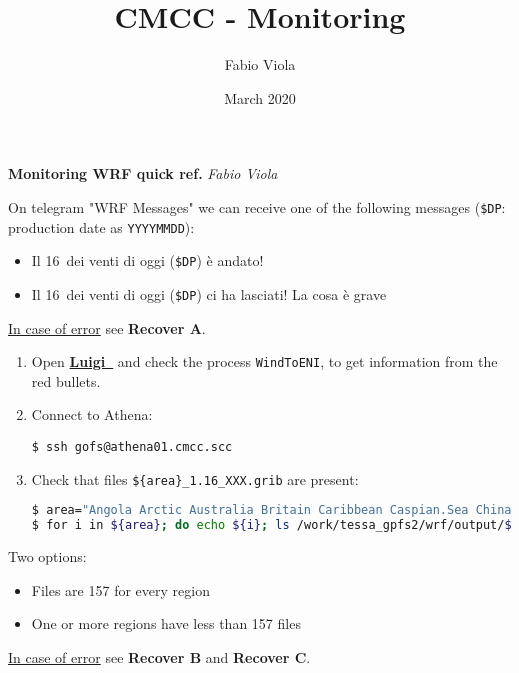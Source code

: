 \documentclass[twocolumn,8pt]{article}
\title{CMCC - Monitoring}
\author{Fabio Viola}
\date{March 2020}
\begin{document}

\LARGE \textbf{Monitoring WRF quick ref.}  \hfill \textit{\small Fabio Viola}\normalsize

\begin{mdframed}[frametitle=(A)\ -- Before 8.45 am]

On telegram "WRF Messages" we can receive one of the following messages (\texttt{\$DP}: production date as \texttt{YYYYMMDD}):
\begin{itemize}\itemsep0pt
\item[{\textcolor{ForestGreen}{\faCheckCircle}}] Il 16\textdegree\, dei venti di oggi (\texttt{\$DP}) è andato!
\item[{\textcolor{Red}{\faTimesCircle}}] Il 16\textdegree\, dei venti di oggi (\texttt{\$DP}) ci ha lasciati! La cosa è grave
\end{itemize}
\ul{In case of error} see \textbf{Recover A}.

\end{mdframed}    

\begin{mdframed}[frametitle=(Recover A)\ -- Before 10 am]
\begin{enumerate}\itemsep0pt
    \item Open \href{http://athena01.cmcc.scc:58082/static/visualiser/index.html#}{\textbf{Luigi\ \faExternalLink}} and check the process \texttt{WindToENI}, to get information from the red bullets.
    
    \item Connect to Athena:
    \begin{lstlisting}
$ ssh gofs@athena01.cmcc.scc
    \end{lstlisting}
    
    \item Check that files \texttt{\$\{area\}\_1.16\_XXX.grib} are present:
    \begin{lstlisting}[breaklines=true, showspaces=false, showstringspaces=false, language=bash]
$ area="Angola Arctic Australia Britain Caribbean Caspian.Sea China.Sea Guinea Gulf.Mex Med.Central Med.East Med.West Mozambique Red.Sea OMANXX" 
$ for i in ${area}; do echo ${i}; ls /work/tessa_gpfs2/wrf/output/${i}_1.16_*.grib | wc -l; done
    \end{lstlisting}
\end{enumerate}

Two options:
\begin{itemize}\itemsep0pt
    \item[{\textcolor{ForestGreen}{\faCheckCircle}}] Files are 157 for every region
    \item[{\textcolor{Red}{\faTimesCircle}}] One or more regions have less than 157 files
\end{itemize}

\ul{In case of error} see \textbf{Recover B} and \textbf{Recover C}.

\end{mdframed}
\end{document}
